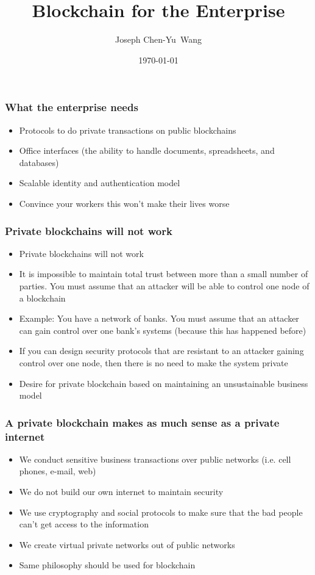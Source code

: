 \documentclass{beamer}
\title {Blockchain for the Enterprise}
\author{Joseph Chen-Yu~Wang}
\institute{Bitquant Research Laboratories (Asia) Limited\\
  in association with the Banzai Institute of Advanced Research\\
  and the Hong Kong Caviliers}
\date{\today}
\begin{document}
\frame{\titlepage}
\begin{frame}
  \frametitle{What the enterprise needs}
  \begin{itemize}
  \item Protocols to do private transactions on public blockchains
  \item Office interfaces (the ability to handle documents,
    spreadsheets, and databases)
  \item Scalable identity and authentication model
  \item Convince your workers this won't make their lives worse
  \end{itemize}
\end{frame}
\begin{frame}
  \frametitle{Private blockchains will not work}
  \begin{itemize}
  \item Private blockchains will not work
  \item It is impossible to maintain total trust between more than a
    small number of parties.  You must assume that an attacker will be
    able to control one node of a blockchain
  \item Example: You have a network of banks.  You must assume that an
    attacker can gain control over one bank's systems (because this
    has happened before)
  \item If you can design security protocols that are resistant to an
    attacker gaining control over one node, then there is no need to
    make the system private
  \item Desire for private blockchain based on maintaining an
    unsustainable business model
  \end{itemize}
\end{frame}
\begin{frame}
  \frametitle{A private blockchain makes as much sense as a private internet}
  \begin{itemize}
    \item We conduct sensitive business transactions over public
      networks (i.e. cell phones, e-mail, web)
    \item We do not build our own internet to maintain security
    \item We use cryptography and social protocols to make sure that
      the bad people can't get access to the information
    \item We create virtual private networks out of public networks
    \item Same philosophy should be used for blockchain
  \end{itemize}
\end{frame}
\end{document}
